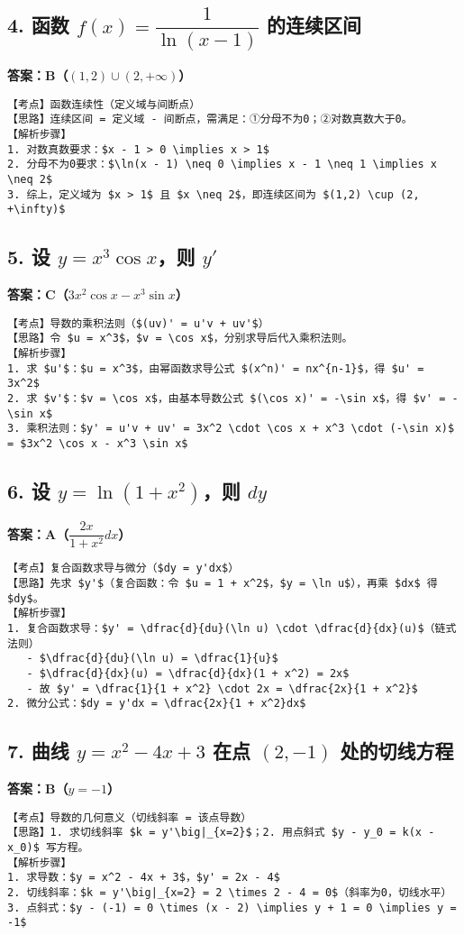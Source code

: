 \documentclass{exam-zh}
\begin{document}
\subsection*{4. 函数 $f(x) = \dfrac{1}{\ln(x - 1)}$ 的连续区间}
\noindent \textbf{答案：B（$(1,2) \cup (2, +\infty)$）}
\begin{verbatim}
【考点】函数连续性（定义域与间断点）
【思路】连续区间 = 定义域 - 间断点，需满足：①分母不为0；②对数真数大于0。
【解析步骤】
1. 对数真数要求：$x - 1 > 0 \implies x > 1$
2. 分母不为0要求：$\ln(x - 1) \neq 0 \implies x - 1 \neq 1 \implies x \neq 2$
3. 综上，定义域为 $x > 1$ 且 $x \neq 2$，即连续区间为 $(1,2) \cup (2, +\infty)$
\end{verbatim}

\subsection*{5. 设 $y = x^3 \cos x$，则 $y'$}
\noindent \textbf{答案：C（$3x^2 \cos x - x^3 \sin x$）}
\begin{verbatim}
【考点】导数的乘积法则（$(uv)' = u'v + uv'$）
【思路】令 $u = x^3$，$v = \cos x$，分别求导后代入乘积法则。
【解析步骤】
1. 求 $u'$：$u = x^3$，由幂函数求导公式 $(x^n)' = nx^{n-1}$，得 $u' = 3x^2$
2. 求 $v'$：$v = \cos x$，由基本导数公式 $(\cos x)' = -\sin x$，得 $v' = -\sin x$
3. 乘积法则：$y' = u'v + uv' = 3x^2 \cdot \cos x + x^3 \cdot (-\sin x)$
= $3x^2 \cos x - x^3 \sin x$
\end{verbatim}

\subsection*{6. 设 $y = \ln(1 + x^2)$，则 $dy$}
\noindent \textbf{答案：A（$\dfrac{2x}{1 + x^2}dx$）}
\begin{verbatim}
【考点】复合函数求导与微分（$dy = y'dx$）
【思路】先求 $y'$（复合函数：令 $u = 1 + x^2$，$y = \ln u$），再乘 $dx$ 得 $dy$。
【解析步骤】
1. 复合函数求导：$y' = \dfrac{d}{du}(\ln u) \cdot \dfrac{d}{dx}(u)$（链式法则）
   - $\dfrac{d}{du}(\ln u) = \dfrac{1}{u}$
   - $\dfrac{d}{dx}(u) = \dfrac{d}{dx}(1 + x^2) = 2x$
   - 故 $y' = \dfrac{1}{1 + x^2} \cdot 2x = \dfrac{2x}{1 + x^2}$
2. 微分公式：$dy = y'dx = \dfrac{2x}{1 + x^2}dx$
\end{verbatim}

\subsection*{7. 曲线 $y = x^2 - 4x + 3$ 在点 $(2, -1)$ 处的切线方程}
\noindent \textbf{答案：B（$y = -1$）}
\begin{verbatim}
【考点】导数的几何意义（切线斜率 = 该点导数）
【思路】1. 求切线斜率 $k = y'\big|_{x=2}$；2. 用点斜式 $y - y_0 = k(x - x_0)$ 写方程。
【解析步骤】
1. 求导数：$y = x^2 - 4x + 3$，$y' = 2x - 4$
2. 切线斜率：$k = y'\big|_{x=2} = 2 \times 2 - 4 = 0$（斜率为0，切线水平）
3. 点斜式：$y - (-1) = 0 \times (x - 2) \implies y + 1 = 0 \implies y = -1$
\end{verbatim}
\end{document}
